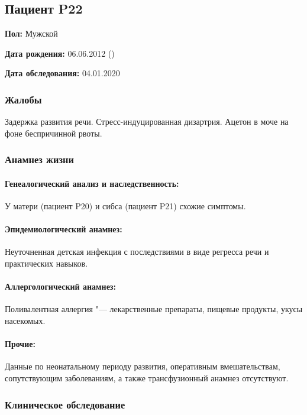 \documentclass[a4paper,14pt]{extarticle}
\begin{document}
\newpage
\subsection*{Пациент P22}

\textbf{Пол:} Мужской

\textbf{Дата рождения:} 06.06.2012 ()

\textbf{Дата обследования:} 04.01.2020

\subsubsection*{Жалобы}

Задержка развития речи.
Стресс-индуцированная дизартрия.
Ацетон в моче на фоне беспричинной рвоты.

\subsubsection*{Анамнез жизни}

\paragraph{Генеалогический анализ и наследственность:} У матери (пациент P20) и сибса (пациент P21) схожие симптомы.

\paragraph{Эпидемиологический анамнез:} Неуточненная детская инфекция с последствиями в виде регресса речи и практических навыков.

\paragraph{Аллергологический анамнез:} Поливалентная аллергия "--- лекарственные препараты, пищевые продукты, укусы насекомых.

\paragraph{Прочие:} Данные по неонатальному периоду развития, оперативным вмешательствам, сопутствующим заболеваниям, а также трансфузионный анамнез отсутствуют.

\subsubsection*{Клиническое обследование}
\end{document}
